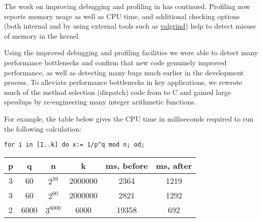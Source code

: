 The work on improving debugging and profiling in \GAP has
continued. Profiling now reports memory usage as well as CPU time, and
additional checking options (both internal and by using external tools such as
\href{http://www.valgrind.org/}{valgrind}) help to detect misuse of memory in the kernel.

Using the improved debugging and profiling facilities we were able to
detect many performance bottlenecks and confirm that new code
genuinely improved performance, as well as detecting many bugs much
earlier in the development process. To alleviate performance
bottlenecks in key applications, we rewrote much of the method
selection (dispatch) code from \GAP to C and gained large speedups by
re-engineering many integer arithmetic functions.

For example, the table below gives the CPU time in milliseconds required
to run the following calculation:

\begin{verbatim}
for i in [1..k] do x:= 1/p^q mod n; od;
\end{verbatim}
\medbreak
\begin{center}
\begin{tabular}{| c | c | c | c | c | c |} 
\hline
p & q    & n          & k        & ms, before & ms, after \\
\hline
3 & 60   & $2^{59}$   & 2000000  & 2364       & 1219 \\
3 & 60   & $2^{60}$   & 2000000  & 2821       & 1292 \\
2 & 6000 & $3^{6000}$ & 6000     & 19358      & 692  \\
\hline
\end{tabular}
\end{center}

%
%

%
%

